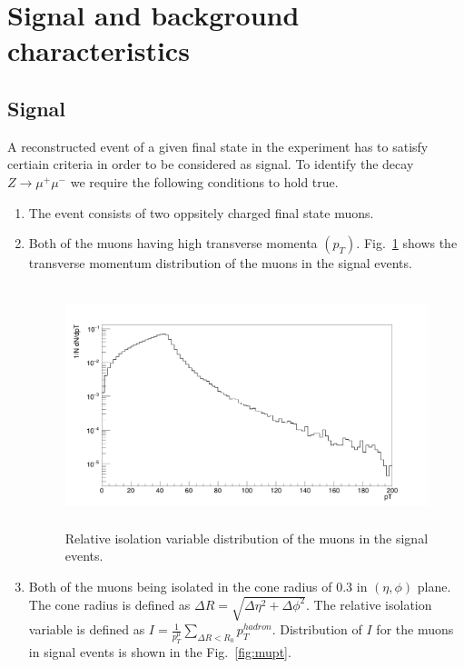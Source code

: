 \documentclass[12pt,a4paper]{article}		%
\begin{document}
\newpage
\section{Signal and background characteristics}

\subsection{Signal}
A reconstructed event of a given final state in the experiment has to satisfy certiain criteria in order to be considered  as signal. 	To identify the decay  $Z \to \mu^+\mu^-$ we require the following conditions to hold true.   
				\begin{enumerate}
					\item The event consists of two oppsitely charged final state muons.
					\item Both of the muons having high transverse momenta $(p_T)$. Fig.~\ref{fig:spt} shows the transverse momentum distribution of the muons in the signal events. 
			
					\begin{figure}[h]
					\centering	
					\includegraphics[width=130mm,height=70mm]{signalpt.png} 
					\caption{ Relative isolation variable distribution of the muons in the signal events.}			
					\label{fig:spt}			
					\end{figure}
					
					
					\item Both of the muons being isolated in the cone radius of 0.3 in $(\eta,\phi)$ plane. The cone radius is defined as $\Delta R = \sqrt{\Delta \eta^2 + \Delta \phi^2}$. The relative isolation variable  is defined as $I = \frac{1}{p_T^{\mu}}\sum_{\Delta R< R_0 }^{} p_T^{hadron}$. Distribution of $I$ for the muons in signal events is shown in the Fig.~\ref{fig:mupt}.
					

\end{enumerate}
\end{document}
